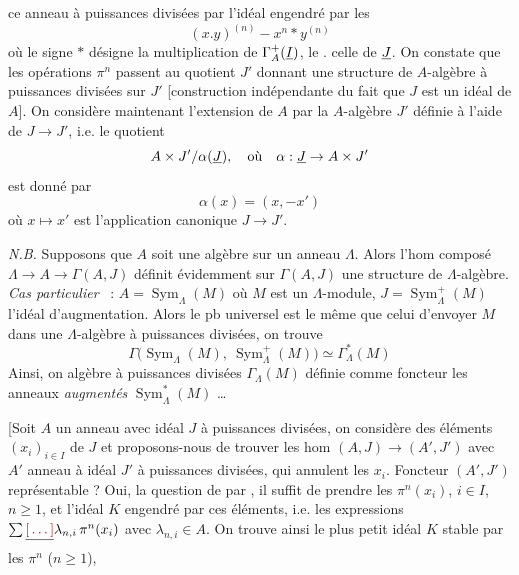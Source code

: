 \documentclass[11pt,a4paper]{article}
\begin{document}
 ce anneau à puissances divisées par l'idéal
engendré par les
\[
  (x.y)^{(n)} - x^{n} * y^{(n)}
\]
où le signe $*$ désigne  la multiplication de
$\Gamma^{+}_{A}(\uncertain{I})$, le $.$ celle de $\uncertain{J}$. On constate que
les opérations $\pi^{n}$ passent au quotient $J'$ 
donnant une structure de $A$-algèbre à puissances divisées
 sur $J'$ [construction indépendante du
fait que $J$ est un idéal de $A$]. On
considère maintenant l'extension de $A$ par la $A$-algèbre $J'$
 définie à
l'aide de $J \to J'$, i.e. le quotient
\[
  A \times J' / \alpha(\uncertain{J}) , \quad \text{où} \quad \alpha : \uncertain{J} \to A \times J'
\]
est donné par
\[
  \alpha(x) = (x, -x')
\]
où $x \mapsto x'$ est l'application canonique $J \to J'$. 

\emph{N.B.} Supposons que $A$ soit une algèbre sur un anneau $\Lambda$. Alors
l'hom composé $\Lambda \to A \to \Gamma(A, J)$ définit
évidemment sur $\Gamma(A, J)$ une structure de $\Lambda$-algèbre.
\emph{Cas particulier} \ : $A = \operatorname{Sym}_{\Lambda}(M)$ où $M$ est un
$\Lambda$-module,  $J = \operatorname{Sym}^{+}_{\Lambda}(M)$ l'idéal
d'augmentation. Alors le pb universel est le même que celui
d'envoyer $M$ dans une $\Lambda$-algèbre à puissances divisées, on trouve
\[
  \Gamma\big(\operatorname{Sym}_{\Lambda}(M),\ \operatorname{Sym}^{+}_{\Lambda}(M)\big)
  \simeq \Gamma^{*}_{\Lambda}(M)
\]
Ainsi, on  \ill{} algèbre \struck{\ill{}} à puissances
divisées $\Gamma_{\Lambda}(M)$ définie comme foncteur
\ill{} les anneaux \emph{augmentés}
$\operatorname{Sym}^{*}_{\Lambda}(M)$ \ldots
{}


[Soit $A$ un \struck{\ill{}} anneau avec idéal $J$ à puissances divisées,
on considère des éléments $(x_{i})_{i \in I}$ de $J$ et
proposons-nous de trouver les hom
$(A, J) \to (A', J')$ avec $A'$ anneau à idéal $J'$ à puissances
divisées, 
qui annulent les $x_{i}$. Foncteur \ill{} $(A', J')$ représentable ? Oui, \ill{}
la question de  par \ill{}, il suffit de prendre
les $\pi^{n}(x_{i})$, $i \in I$, $n \geqslant 1$, et
l'idéal $K$ engendré par ces éléments, i.e. les
expressions $\sum \struck{\ill{}} \lambda_{n,i}\, \pi^{n}(x_{i})$ avec
$\lambda_{n,i} \in A$. On trouve ainsi le plus petit idéal $K$ stable par les
$\pi^{n}$ ($n \geqslant 1$),
\end{document}
